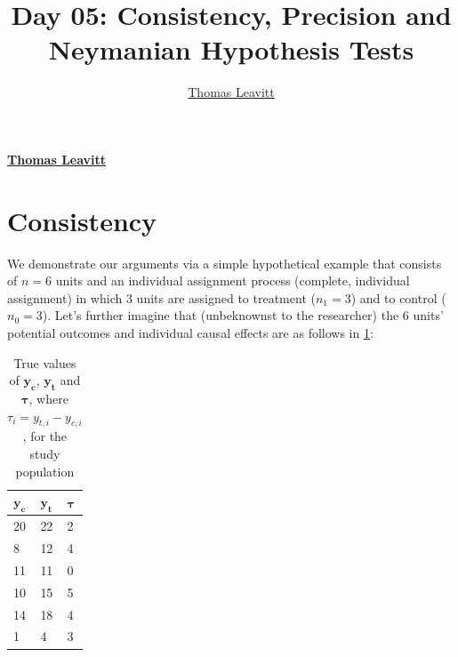 \documentclass[12pt,leqno]{article}
\title{Day 05: Consistency, Precision and Neymanian Hypothesis Tests  }
\author{\Large \href{mailto:t.leavitt718@gmail.com}{Thomas Leavitt}\vspace{0.05in} \newline\normalsize\emph{}  }
\date{}
\newcommand*{\authorfont}{\fontfamily{phv}\selectfont}
\theoremstyle{newstyle}
\begin{document}
	
%

{%
\setlength{\parindent}{0pt}
\thispagestyle{plain}
{\fontsize{18}{20}\selectfont\raggedright 
\maketitle  %

}

{
   \vskip 13.5pt\relax \normalsize\fontsize{11}{12} 
\textbf{\authorfont \href{mailto:t.leavitt718@gmail.com}{Thomas Leavitt}} \hskip 15pt \emph{\small }   

}

}





\vskip 6.5pt

\noindent  \hypertarget{consistency}{%
\section{Consistency}\label{consistency}}

We demonstrate our arguments via a simple hypothetical example that
consists of \(n = 6\) units and an individual assignment process
(complete, individual assignment) in which \(3\) units are assigned to
treatment (\(n_1 = 3\)) and to control (\(n_0 = 3\)). Let's further
imagine that (unbeknownst to the researcher) the \(6\) units' potential
outcomes and individual causal effects are as follows in
\cref{tab: true potential outcomes}:

\begin{table}[H]
\centering{}
    \begin{tabular}{l|l|l}
    $\mathbf{y_c}$ & $\mathbf{y_t}$ & $\pmb{\tau}$ \\ \midrule
    20 & 22 & 2 \\
     8 & 12 & 4 \\
    11 & 11 & 0 \\
    10 & 15 & 5 \\
    14 & 18 & 4 \\
     1 &  4 & 3 \\
    \end{tabular}
\caption{True values of $\mathbf{y_c}$, $\mathbf{y_t}$ and $\pmb{\tau}$, where $\tau_i = y_{t,i} - y_{c,i}$, for the study population} \label{tab: true potential outcomes}
\end{table}
\end{document}
